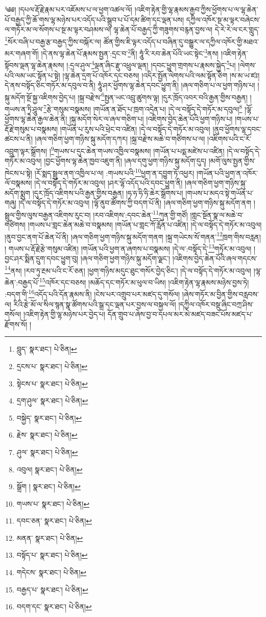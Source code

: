 \setcounter{footnote}{0} 
༄༅། །དཔལ་རྡོ་རྗེ་རྣམ་པར་འཇོམས་པ་ལ་ཕྱག་འཚལ་ལོ། །འཇིག་རྟེན་གྱི་ལྷ་རྣམས་རྒྱབ་ཀྱིས་ཕྱོགས་པ་ལ་ལྷ་ཆེན་པོ་བརྒྱད་ཀྱི་ཆོ་གས་ལྷ་མཉེས་པར་འདོད་པའི་སྒྲུབ་པ་པོ་དམ་ཚིག་དང་ལྡན་པས། དཀྱིལ་འཁོར་སྔ་མ་ལྟར་བཞེངས་ལ་གཏོར་མ་ལ་སོགས་པ་སྔ་མ་ལྟར་བཤམས་ལ། ལྷ་ཆེན་པོ་བརྒྱད་ཀྱི་གཟུགས་བརྙན་བྱས་ལ། དེ་རེ་རེ་ལ་ངར་གླུད་\footnote{བླུད་  སྣར་ཐང་།  པེ་ཅིན། }སོར་བཞི་པ་བརྒྱ་རྩ་བརྒྱད་ཀྱིས་བསྐོར་ལ། ཚོན་གྱིས་ཇི་ལྟར་འདོད་པ་བཞིན་དུ་བསྒྱུར་ལ་དཀྱིལ་འཁོར་གྱི་མཐའ་མར་གཞག་གོ། །དེ་ནས་ལྷ་ཆེན་པོ་རྣམས་སྤྱན་:དྲང་བ་\footnote{དྲངས་པ་  སྣར་ཐང་།  པེ་ཅིན། }ནི། ཧཱུཾ་རི་རབ་ཆེན་པོའི་ཡང་སྟེང་\footnote{སྟེངས་པ་  སྣར་ཐང་།  པེ་ཅིན། }ནས། །འཇིག་རྟེན་སྟོབས་ལྡན་ལྷ་ཆེན་རྣམས། །:དྲལ་ཤུལ་\footnote{དྲག་ཤུལ་  སྣར་ཐང་།  པེ་ཅིན། }ལྡན་ཞིང་རྫུ་འཕྲུལ་ལྡན། །དབང་ཕྱུག་གྲགས་པ་རྣམས་སྐྱེད་\footnote{བསྐྱེད་  སྣར་ཐང་།  པེ་ཅིན། }པ། །ལེགས་པའི་ལམ་ཡང་སྟོན་པ་སྟེ། །ལྷ་ཆེན་དྲག་པོ་འཁོར་དང་བཅས། །འདིར་སྤྱོན་ལེགས་པའི་ལམ་སྟོན་ཅིག །ས་མ་ཡ་ཛཿ། དེ་ནས་བསྟོད་ཅིང་གཏོར་མ་དབུལ་བ་ནི། ཧཱུཾ་ཤར་ཕྱོགས་ལྷ་ཆེན་དབང་ཕྱུག་ནི། །ཞལ་གཅིག་པ་ལ་ཕྱག་གཉིས་པ། །སྐུ་མདོག་སྔོ་སྐྱ་འཇིགས་བྱེད་པ། །སྐྲ་བརྫེས་\footnote{རྗེས་  སྣར་ཐང་།  པེ་ཅིན། }སྤྱན་ཡང་འབྲུ་ཚུགས་ལྟ། །དུར་ཁྲོད་འབར་བའི་རྒྱན་གྱིས་བརྒྱན། །གཡས་ན་ཏྲི་ཤཱུལ་\footnote{ཤུལ་  སྣར་ཐང་།  པེ་ཅིན། }རྩེ་གསུམ་བསྣམས། །གཡོན་ན་ཐོད་པ་ཁྲག་འདྲེན་པ། །དེ་ལ་བསྟོད་དེ་གཏོར་མ་དབུལ།\footnote{འབུལ།  སྣར་ཐང་།  པེ་ཅིན། } །ལྷོ་ཕྱོགས་ལྷ་ཆེན་རྒྱལ་ཆེན་ནི། །སྐུ་མདོག་སེར་ལ་ཞལ་གཅིག་པ། །འཇིགས་བྱེད་ཆེན་པོའི་ཕྱག་གཉིས་པ། །གཡས་པ་རྡོ་རྗེ་གསུམ་པ་བསྣམས། །གཡོན་པ་རུས་པའི་ཕྲེང་བ་འཛིན། །དེ་ལ་བསྟོད་དེ་གཏོར་མ་འབུལ། །ནུབ་ཕྱོགས་ལྷ་དབང་ཚངས་པ་ནི། །ཞལ་གཅིག་ཕྱག་གཉིས་སྐུ་མདོག་དཀར། །སྐྲ་བརྫེས་མཆེ་བ་གཙིགས་པ་ལ། །འཇིགས་པའི་ང་རོ་འབྲུག་ལྟར་སྒྲོགས། །\footnote{སྒྲོག །  སྣར་ཐང་།  པེ་ཅིན། }གཡས་པ་དུང་ཆེན་གཡས་འཁྱིལ་བསྣམས། །གཡོན་པ་པདྨ་མཛེས་པ་འཛིན། །དེ་ལ་བསྟོད་དེ་གཏོར་མ་འབུལ། །བྱང་ཕྱོགས་ལྷ་ཆེན་ཁྱབ་འཇུག་ནི། །ཞལ་དགུ་ཕྱག་གཉིས་སྐུ་མདོག་དུད། །མགོ་ལུས་སྤྱན་གྱིས་ཁེངས་པ་སྟེ། །རོ་སྨད་སྦྲུལ་ནག་འཁྱིལ་པ་ལ། :གཡས་པའི་\footnote{གཡས་པ་  སྣར་ཐང་།  པེ་ཅིན། }ཕྱག་ན་དབྱུག་ཏོ་འཕྱར། །གཡོན་པའི་ཕྱག་ན་འཁོར་ལོ་བསྣམས། །དེ་ལ་བསྟོད་དེ་གཏོར་མ་འབུལ། །ཤར་ལྷོ་འདོད་པའི་དབང་ཕྱུག་ནི། །ཞལ་གཅིག་ཕྱག་གཉིས་སྐུ་མདོག་སྨུག །དུར་ཁྲོད་འཇིགས་པའི་རྒྱན་གྱིས་བརྒྱན། །ཧ་ཧ་ཧི་ཧི་ཆེར་སྒྲོགས་པ། །གཡས་པ་མདའ་སྟེ་གཡོན་པ་གཞུ། །དེ་ལ་བསྟོད་དེ་གཏོར་མ་འབུལ། །ལྷོ་ནུབ་ཚོགས་ཀྱི་བདག་པོ་ནི། །ཞལ་གཅིག་ཕྱག་གཉིས་སྐུ་མདོག་ནག །སྦྲུལ་གྱིས་ལུས་བརྒྱན་འཇིགས་རུང་བ། །རབ་འཇིགས་:དབང་ཆེན་\footnote{དབང་ཅན་  སྣར་ཐང་།  པེ་ཅིན། }ཀུན་གྱི་གཙོ། །གླང་སྔོན་སྣ་ལ་མཆེ་བ་གཙིགས། །གཡས་པ་གླང་ཆེན་མཆེ་བ་བསྣམས། །གཡོན་པ་གླང་ཀོ་རློན་པ་འཛིན། །དེ་ལ་བསྟོད་དེ་གཏོར་མ་འབུལ། །ནུབ་བྱང་ནག་པོ་ཆེན་པོ་ནི། །ཞལ་གཅིག་ཕྱག་གཉིས་སྐུ་མདོག་གནག །སྐྲ་གཡེངས་སོ་གནན་\footnote{མནན་  སྣར་ཐང་།  པེ་ཅིན། }ཁྲག་གིས་བརླན། །
གཡས་པ་རྡོ་རྗེ་རྩེ་གསུམ་འཛིན། །གཡོན་པའི་ཕྱག་ན་ཞགས་པ་བསྣམས། །དེ་ལ་:བསྟོད་དེ་\footnote{བསྟོད་པ་  སྣར་ཐང་།  པེ་ཅིན། }གཏོར་མ་འབུལ། །བྱང་ཤར་སྨིན་དྲུག་དབང་ཕྱུག་བུ། །ཞལ་གཅིག་ཕྱག་གཉིས་སྐུ་མདོག་ལྗང་། །འཇིགས་བྱེད་ཆེན་པོའི་ཞལ་གདངས་\footnote{གདེངས་  སྣར་ཐང་།  པེ་ཅིན། }ནས། །རབ་ཏུ་རྔམ་པའི་ང་རོ་ཅན། །ཕྱག་གཉིས་མདུང་ཐུང་གསོར་བྱེད་ཅིང་། །དེ་ལ་བསྟོད་དེ་གཏོར་མ་འབུལ། །ལྷ་ཆེན་:བརྒྱད་པོ་\footnote{བརྒྱད་པ་  སྣར་ཐང་།  པེ་ཅིན། }འཁོར་དང་བཅས། །མཆོད་དང་གཏོར་མ་ཕུལ་བ་ཡིས། །འཇིག་རྟེན་ལྷ་རྣམས་མཉེས་བྱས་ཏེ། :བདག་གི་\footnote{བདག་དང་  སྣར་ཐང་།  པེ་ཅིན། }འདོད་པའི་དོན་རྣམས་ནི། །ངེས་པར་འགྲུབ་པར་མཛད་དུ་གསོལ། །ཞེས་གཏོར་མ་བྱིན་གྱིས་བརླབས་ལ། རིའི་རྩེ་མོ་ལ་སིལ་སྙན་སྣ་ཚོགས་པའི་སྒྲ་དང་ལྡན་པར་བྱས་ལ་བསྐྱལ་ལོ། །དཀྱིལ་འཁོར་བསྡུ་ཞིང་བཀྲ་ཤིས་གསོལ། །འཇིག་རྟེན་གྱི་ལྷ་མཉེས་པར་བྱེད་པ། དོན་གྲུབ་པ་ཞེས་བྱ་བ་དཔལ་མར་མེ་མཛད་བཟང་པོས་མཛད་པ་རྫོགས་སོ། ། 